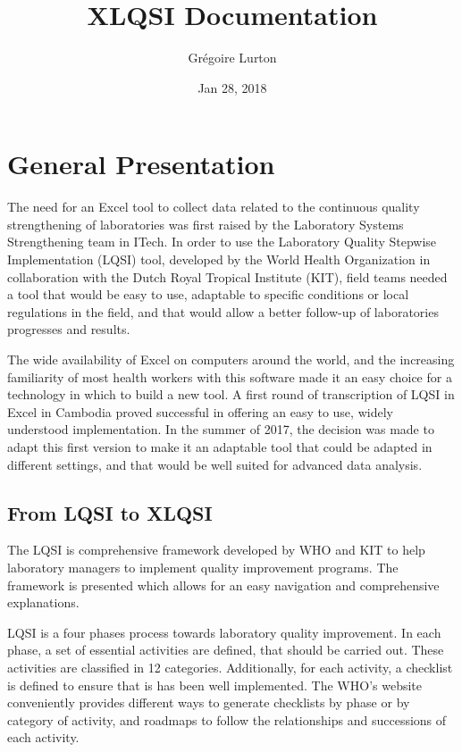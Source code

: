\documentclass[letterpaper,10pt,english]{sphinxmanual}
\title{XLQSI Documentation}
\date{Jan 28, 2018}
\author{Grégoire Lurton}
\begin{document}
\maketitle
\sphinxtableofcontents
{}\label{\detokenize{index::doc}}



\chapter{General Presentation}
\label{\detokenize{intro::doc}}\label{\detokenize{intro:general-presentation}}\label{\detokenize{intro:documentation-for-xlqsi-s}}
The need for an Excel tool to collect data related to the continuous quality strengthening of laboratories was first raised by the Laboratory Systems
Strengthening team in ITech. In order to use the Laboratory Quality Stepwise Implementation (LQSI) tool, developed by the World Health Organization in collaboration with the Dutch Royal Tropical Institute (KIT), field teams needed a tool that would be easy to use, adaptable to specific conditions or local regulations in the field, and that would allow a better follow-up of laboratories progresses and results.

The wide availability of Excel on computers around the world, and the increasing familiarity of most health workers with this software made it an easy choice for a technology in which to build a new tool. A first round of transcription of LQSI in Excel in Cambodia proved successful in offering an easy to use, widely understood implementation. In the summer of 2017, the decision was made to adapt this first version to make it an adaptable tool that could be adapted in different settings, and that would be well suited for advanced data analysis.


\section{From LQSI to XLQSI}
\label{\detokenize{intro:from-lqsi-to-xlqsi}}
The LQSI is comprehensive framework developed by WHO and KIT to help laboratory managers to implement quality improvement programs. The framework is presented  which allows for an easy navigation and comprehensive explanations.

LQSI is a four phases process towards laboratory quality improvement. In each phase, a set of essential activities are defined, that should be carried out. These activities are classified in 12 categories. Additionally, for each activity, a checklist is defined to ensure that is has been well implemented. The WHO’s website conveniently provides different ways to generate checklists by phase or by category of activity, and roadmaps to follow the relationships and successions of each activity.
\end{document}
